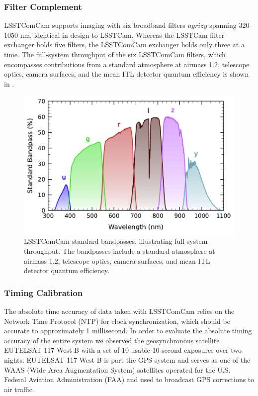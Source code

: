 \subsubsection{Filter Complement}
\label{sssec:comcam_filters}
\gls{LSSTComCam} supports imaging with six broadband filters $ugrizy$ spanning 320--1050 nm, identical in design to LSSTCam.
Whereas the LSSTCam filter exchanger holds five filters, the LSSTComCam exchanger holds only three at a time.
The full-system throughput of the six LSSTComCam filters, which encompasses contributions from a standard atmosphere at airmass 1.2, telescope optics,
camera surfaces, and the mean ITL detector quantum efficiency is shown in .
\begin{figure}[htb!]
\includegraphics[width=\linewidth]{dp1_comcam_std_bandpasses}
\caption{LSSTComCam standard bandpasses, illustrating full system throughput. The bandpasses include a standard atmosphere at airmass 1.2, telescope optics, camera surfaces, and mean ITL detector quantum efficiency.}
\label{fig:comcam_standard_bandpasses}
\end{figure}

\subsubsection{Timing Calibration}
\label{ssec:comcam_timing}

The absolute time accuracy of data taken with \gls{LSSTComCam} relies on the Network Time Protocol (NTP) for clock synchronization, which should be accurate to approximately 1 millisecond.
In order to evaluate the absolute timing accuracy of the entire system we observed the geosynchronous satellite EUTELSAT 117 West B with a set of 10 usable 10-second exposures over two nights.
EUTELSAT 117 West B is part the GPS system and serves as one of the WAAS (Wide Area Augmentation System) satellites operated for the U.S. Federal Aviation Administration (FAA) and used to broadcast GPS corrections to air traffic.

